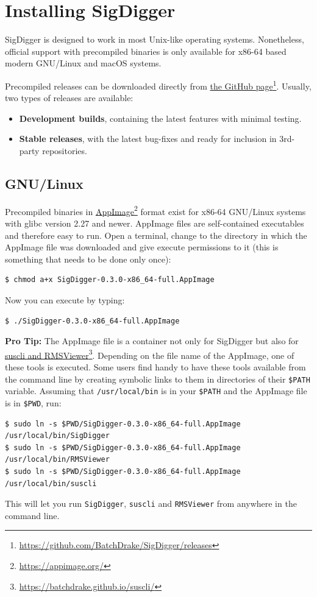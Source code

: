 \documentclass{ol-softwaremanual}
\newcommand{\doclink}[2]{\href{#1}{#2}\footnote{\url{#1}}}
\begin{document}
\chapter{Installing SigDigger}
SigDigger is designed to work in most Unix-like operating systems. Nonetheless, official support with precompiled binaries is only available for x86-64 based modern GNU/Linux and macOS systems.

Precompiled releases can be downloaded directly from \doclink{https://github.com/BatchDrake/SigDigger/releases}{the GitHub page}. Usually, two types of releases are available:
\begin{itemize}
    \item \textbf{Development builds}, containing the latest features with minimal testing.
    \item \textbf{Stable releases}, with the latest bug-fixes and ready for inclusion in 3rd-party repositories.
\end{itemize}

\section{GNU/Linux}
Precompiled binaries in \doclink{https://appimage.org/}{AppImage} format exist for x86-64 GNU/Linux systems with glibc version 2.27 and newer. AppImage files are self-contained executables and therefore easy to run. Open a terminal, change to the directory in which the AppImage file was downloaded and give execute permissions to it (this is something that needs to be done only once):

\begin{lstlisting}
$ chmod a+x SigDigger-0.3.0-x86_64-full.AppImage
\end{lstlisting}

Now you can execute by typing:

\begin{lstlisting}
$ ./SigDigger-0.3.0-x86_64-full.AppImage
\end{lstlisting}

\begin{protip}
\textbf{Pro Tip:} The AppImage file is a container not only for SigDigger but also for \doclink{https://batchdrake.github.io/suscli/}{suscli and RMSViewer}. Depending on the file name of the AppImage, one of these tools is executed. Some users find handy to have these tools available from the command line by creating symbolic links to them in directories of their \texttt{\$PATH} variable. 
Assuming that \texttt{/usr/local/bin} is in your \texttt{\$PATH} and the AppImage file is in \texttt{\$PWD}, run:

\begin{lstlisting}
$ sudo ln -s $PWD/SigDigger-0.3.0-x86_64-full.AppImage /usr/local/bin/SigDigger
$ sudo ln -s $PWD/SigDigger-0.3.0-x86_64-full.AppImage /usr/local/bin/RMSViewer
$ sudo ln -s $PWD/SigDigger-0.3.0-x86_64-full.AppImage /usr/local/bin/suscli
\end{lstlisting}

This will let you run \texttt{SigDigger}, \texttt{suscli} and \texttt{RMSViewer} from anywhere in the command line.
\end{protip}
\end{document}
